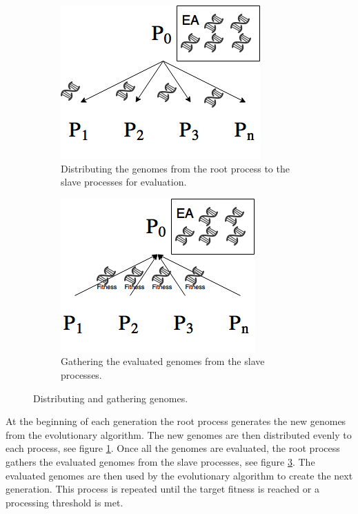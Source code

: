 \begin{figure}[H]
	\centering
	\begin{subfigure}[t]{0.45\textwidth}
		\centering
		\includegraphics[scale=0.5]{chapters/res/mpi-distribute.png}
		\caption{Distributing the genomes from the root process to the slave processes for evaluation.}
		\label{fig:distribute-genomes}
	\end{subfigure}
	\begin{subfigure}[t]{0.45\textwidth}
		\centering
		\includegraphics[scale=0.5]{chapters/res/mpi-gather.png}
		\caption{Gathering the evaluated genomes from the slave processes.}
		\label{fig:gather-genomes}
	\end{subfigure}
	\caption{Distributing and gathering genomes.}
\end{figure}
At the beginning of each generation the root process generates the new genomes from the evolutionary algorithm.
The new genomes are then distributed evenly to each process, see figure \ref{fig:distribute-genomes}.
Once all the genomes are evaluated, the root process gathers the evaluated genomes from the slave processes, see figure \ref{fig:gather-genomes}.
The evaluated genomes are then used by the evolutionary algorithm to create the next generation.
This process is repeated until the target fitness is reached or a processing threshold is met. 

